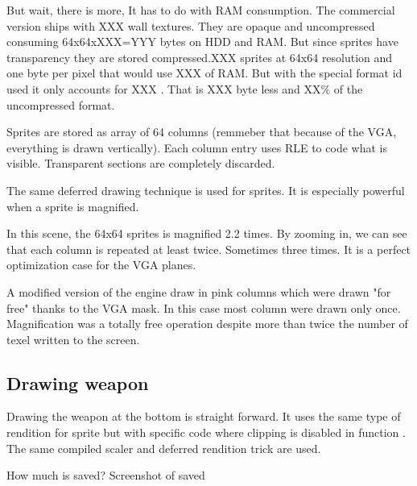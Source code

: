 \par
But wait, there is more, It has to do with RAM consumption. The commercial version ships with XXX wall textures. They are opaque and uncompressed consuming 64x64xXXX=YYY bytes on HDD and RAM. But since sprites have transparency they are stored compressed.XXX sprites at 64x64 resolution and one byte per pixel that would use XXX of RAM. But with the special format id used it only accounts for XXX . That is XXX byte less and XX\% of the uncompressed format.\\
\par
{}
\par
\par
Sprites are stored as array of 64 columns (remmeber that because of the VGA, everything is drawn vertically). Each column entry uses RLE to code what is visible. Transparent sections are completely discarded.\\
\par
The same deferred drawing technique is used for sprites. It is especially powerful when a sprite is magnified.\\

\par
\begin{figure}[H]
 \centering
\end{figure}
In this scene, the 64x64 sprites is magnified 2.2 times. By zooming in, we can see that each column is repeated at least twice. Sometimes three times. It is a perfect optimization case for the VGA planes.
\par
\begin{figure}[H]
 \centering
\end{figure}
A modified version of the engine draw in pink columns which were drawn "for free" thanks to the VGA mask. In this case most column were drawn only once. Magnification was a totally free operation despite more than twice the number of texel written to the screen.
\par
\begin{figure}[H]
 \centering
\end{figure}






\subsection{Drawing weapon}
Drawing the weapon at the bottom is straight forward. It uses the same type of rendition for sprite but with specific code where clipping is disabled in function . The same compiled scaler and deferred rendition trick are used.
\par
How much is saved? Screenshot of saved
\par
{}















